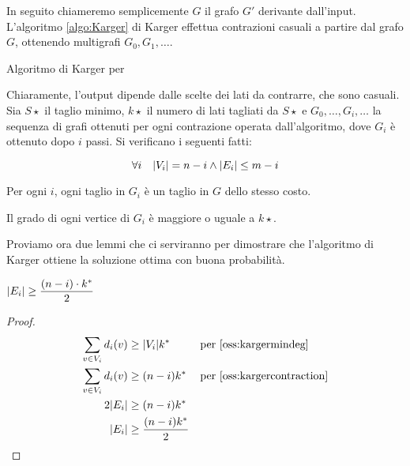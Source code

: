 In seguito chiameremo semplicemente $G$ il grafo $G'$ derivante dall'input. L'algoritmo \ref{algo:Karger} di Karger effettua contrazioni casuali a partire dal grafo $G$, ottenendo multigrafi $G_0,G_1,\dots$.

\begin{algorithm}[ht]
	\caption{Algoritmo di Karger per \MinCut}
	\label{algo:Karger}
	
\end{algorithm}

Chiaramente, l'output dipende dalle scelte dei lati da contrarre, che sono casuali.
Sia $S\star$ il taglio minimo, $k\star$ il numero di lati tagliati da $S\star$ e $G_0,\dots,G_i,\dots$ la sequenza di grafi ottenuti per ogni contrazione operata dall'algoritmo, dove $G_i$ è ottenuto dopo $i$ passi. Si verificano i seguenti fatti:
\begin{oss}\label{oss:kargercontraction}
	\begin{equation*}
		\forall i \quad | V_i | = n-i \land | E_i | \leq m-i
	\end{equation*}
\end{oss}
\begin{oss}\label{oss:kargercuts}
	Per ogni $i$, ogni taglio in $G_i$ è un taglio in $G$ dello stesso costo.
\end{oss}
\begin{oss}\label{oss:kargermindeg}
	Il grado di ogni vertice di $G_i$ è maggiore o uguale a $k\star$.
\end{oss}

Proviamo ora due lemmi che ci serviranno per dimostrare che l'algoritmo di Karger ottiene la soluzione ottima con buona probabilità.
\begin{lemma}\label{lem:kargeredges}
	$\displaystyle | E_i | \geq \frac{(n-i) \cdot k^*}{2}$
\end{lemma}
\begin{proof}
	\begin{align*}
		\sum_{v\in V_i} d_i(v) & \geq \card{V_i} k\star      &  & \text{per \cref{oss:kargermindeg}}      \\
		\sum_{v\in V_i} d_i(v) & \geq (n-i) k\star           &  & \text{per \cref{oss:kargercontraction}} \\
		2\card{E_i}            & \geq (n-i) k\star                                                        \\
		\card{E_i}             & \geq \frac{(n-i) k\star}{2}                                              \\
	\end{align*}
\end{proof}

